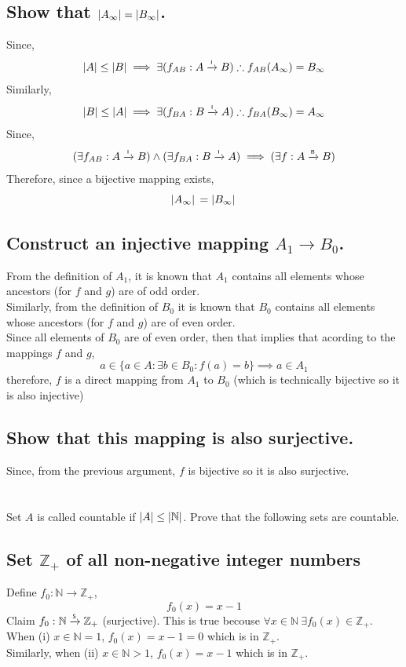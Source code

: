 \documentclass[]{article}
\newcommand{\N}{\mathbb{N}}
\newcommand{\Z}{\mathbb{Z}}
\newcommand{\toI}{\xrightarrow{\textsf{\tiny I}}}
\newcommand{\toS}{\xrightarrow{\textsf{\tiny S}}}
\newcommand{\toB}{\xrightarrow{\textsf{\tiny B}}}
\begin{document}
\subsection{Show that $\abs{A_\infty}=\abs{B_\infty}$.}

Since,
$$\abs{A} \leq \abs{B} \implies \exists (f_{AB} : A \toI B) \therefore f_{AB}(A_\infty) = B_\infty$$
Similarly,
$$\abs{B} \leq \abs{A} \implies \exists (f_{BA} : B \toI A) \therefore f_{BA}(B_\infty) = A_\infty$$
Since,
$$(\exists f_{AB} : A \toI B) \land (\exists f_{BA} : B \toI A) 
\implies (\exists f : A \toB B)$$
Therefore, since a bijective mapping exists,
$$\abs*{A_\infty} = \abs*{B_\infty}$$

\subsection{Construct an injective mapping $A_1 \rightarrow B_0$.}

From the definition of $A_1$,
it is known that $A_1$ contains all elements whose ancestors (for $f$ and $g$) are of odd order.\\
Similarly, from the definition of $B_0$ it is known that $B_0$ contains all elements whose 
ancestors (for $f$ and $g$) are of even order.\\
Since all elements of $B_0$ are of even order, then that implies that acording to the mappings
$f$ and $g$, $$a \in \{a \in A : \exists b \in B_0 : f(a) = b\} \implies a \in A_1$$
therefore, $f$ is a direct mapping from $A_1$ to $B_0$ 
(which is technically bijective so it is also injective)

\subsection{Show that this mapping is also surjective.}
Since, from the previous argument, $f$ is bijective so it is also surjective.



%
%
% 
% 
% 
% 
% 
% 
% 





\newpage
\section{}
Set $A$ is called countable if $\abs{A} \leq \abs{\N}$.
Prove that the following sets are countable.

\subsection{Set $\Z_+$ of all non-negative integer numbers}
Define $f_0 : \N \to \Z_+$, 
\begin{displaymath}
	f_0(x) = x - 1
\end{displaymath}
Claim $f_0 : \N \toS \Z_+$ (surjective).
This is true becouse $\forall x \in \N \ \exists f_0(x) \in \Z_+$.\\
When (i) $x \in \N = 1$, $f_0(x) = x - 1 = 0$ which is in $\Z_+$.\\
Similarly, when (ii) $x \in \N > 1$, $f_0(x) = x - 1$ which is in $\Z_+$.\\
\end{document}

